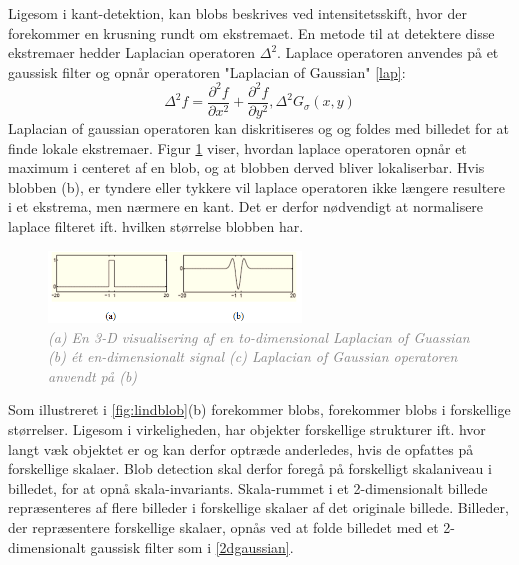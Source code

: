 Ligesom i kant-detektion, kan blobs beskrives ved intensitetsskift, hvor der forekommer en krusning rundt om ekstremaet. En metode til at detektere disse ekstremaer hedder Laplacian operatoren $\Delta^2$. Laplace operatoren anvendes på et gaussisk filter og opnår operatoren "Laplacian of Gaussian" \eqref{lap}:
\begin{equation}
\Delta^2 f = \dfrac{\partial^2 f}{\partial x^2}+\dfrac{\partial^2 f}{\partial y^2}, \Delta^2G_{\sigma}(x,y)
\label{lap}
\end{equation}
Laplacian of gaussian operatoren kan diskritiseres og og foldes med billedet for at finde lokale ekstremaer. Figur \ref{fig:lapgauss} viser, hvordan laplace operatoren opnår et maximum i centeret af en blob, og at blobben derved bliver lokaliserbar. Hvis blobben (b), er tyndere eller tykkere vil laplace operatoren ikke længere resultere i et ekstrema, men nærmere en kant. Det er derfor nødvendigt at normalisere laplace filteret ift. hvilken størrelse blobben har.
\begin{figure}[H]
    \centering
    \includegraphics[width=0.60\textwidth]{fig/16.png}
    \vspace{-0.5em}   
    \begin{center}
    \caption{\textcolor{gray}{\footnotesize \textit{
    (a) En 3-D visualisering af en to-dimensional Laplacian of Guassian (b) ét en-dimensionalt signal (c) Laplacian of Gaussian operatoren anvendt på (b)}}}
    \label{fig:lapgauss}
     \end{center}
  \end{figure}
       \vspace{-2.5em}
\noindent
Som illustreret i \ref{fig:lindblob}(b) forekommer blobs, forekommer blobs i forskellige størrelser. Ligesom i virkeligheden, har objekter forskellige strukturer ift. hvor langt væk objektet er og kan derfor optræde anderledes, hvis de opfattes på forskellige skalaer. Blob detection skal derfor foregå på forskelligt skalaniveau i billedet, for at opnå skala-invariants. Skala-rummet i et 2-dimensionalt billede repræsenteres af flere billeder i forskellige skalaer af det originale billede. Billeder, der repræsentere forskellige skalaer, opnås ved at folde billedet med et 2-dimensionalt gaussisk filter som i \eqref{2dgaussian}. 
